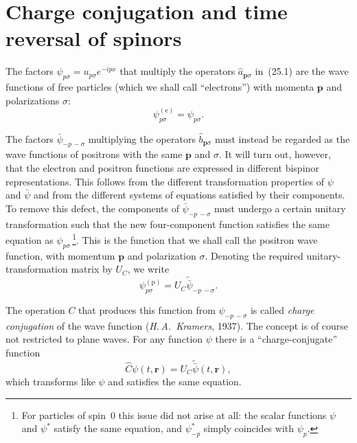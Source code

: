 \section{Charge conjugation and time reversal of spinors}

The factors $\psi_{p\sigma} = u_{p\sigma}e^{-ipx}$ that multiply the operators $\widehat a_{\mathbf{p}\sigma}$ in~(25.1) are the wave functions of free particles (which we shall call ``electrons'') with momenta $\mathbf{p}$ and polarizations $\sigma$:
\[
\psi^{(\text{e})}_{p\sigma} = \psi_{p\sigma}.
\]

The factors $\bar\psi_{-p\,-\sigma}$ multiplying the operators $\widehat b_{\mathbf p\sigma}$ must instead be regarded as the wave functions of positrons with the same $\mathbf{p}$ and $\sigma$. It will turn out, however, that the electron and positron functions are expressed in different bispinor representations. This follows from the different transformation properties of $\psi$ and $\bar\psi$ and from the different systems of equations satisfied by their components. To remove this defect, the components of $\bar\psi_{-p\,-\sigma}$ must undergo a certain unitary transformation such that the new four-component function satisfies the same equation as $\psi_{p\sigma}$\,\footnote{For particles of spin~0 this issue did not arise at all: the scalar functions $\psi$ and $\psi^*$ satisfy the same equation, and $\psi^*_{-p}$ simply coincides with $\psi_p$.}. This is the function that we shall call the positron wave function, with momentum $\mathbf{p}$ and polarization $\sigma$. Denoting the required unitary-transformation matrix by $U_C$, we write
\begin{equation}
\psi^{(\text{p})}_{p\sigma} = U_C\widetilde{\bar\psi}_{-p\,-\sigma}.
\tag{26.1}
\end{equation}

The operation $C$ that produces this function from $\psi_{-p\,-\sigma}$ is called \emph{charge conjugation} of the wave function (\emph{H.\,A.~Kramers}, 1937). The concept is of course not restricted to plane waves. For any function $\psi$ there is a ``charge-conjugate'' function
\begin{equation}
\widehat C\psi(t,\mathbf{r}) = U_C\widetilde{\bar\psi}(t,\mathbf{r}),
\tag{26.2}
\end{equation}
which transforms like $\psi$ and satisfies the same equation.

